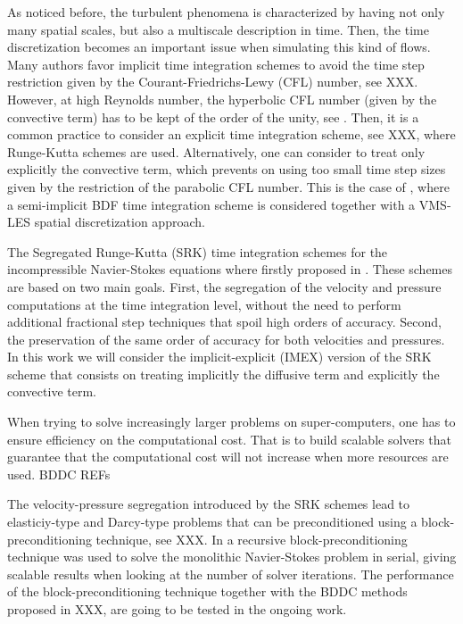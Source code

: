 As noticed before, the turbulent phenomena is characterized by having not only many spatial scales, but also a multiscale description in time. Then, the time discretization becomes an important issue when simulating this kind of flows. Many authors favor implicit time integration schemes to avoid the time step restriction given by the Courant-Friedrichs-Lewy (CFL) number, see XXX. However, at high Reynolds number, the hyperbolic CFL number (given by the convective term) has to be kept of the order of the unity, see \cite{choi_effects_of_the computational...}. Then, it is a common practice to consider an explicit time integration scheme, see XXX, where Runge-Kutta schemes are used. Alternatively, one can consider to treat only explicitly the convective term, which prevents on using too small time step sizes given by the restriction of the parabolic CFL number. This is the case of \cite{forti}, where a semi-implicit BDF time integration scheme is considered together with a VMS-LES spatial discretization approach.

The Segregated Runge-Kutta (SRK) time integration schemes for the incompressible Navier-Stokes equations where firstly proposed in \cite{colomes_segregated}. These schemes are based on two main goals. First, the segregation of the velocity and pressure computations at the time integration level, without the need to perform additional fractional step techniques that spoil high orders of accuracy. Second, the preservation of the same order of accuracy for both velocities and pressures. In this work we will consider the implicit-explicit (IMEX) version of the SRK scheme that consists on treating implicitly the diffusive term and explicitly the convective term.

When trying to solve increasingly larger problems on super-computers, one has to ensure efficiency on the computational cost. That is to build scalable solvers that guarantee that the computational cost will not increase when more resources are used. BDDC REFs

The velocity-pressure segregation introduced by the SRK schemes lead to elasticiy-type and Darcy-type problems that can be preconditioned using a block-preconditioning technique, see XXX. In \cite{colomes_mixed} a recursive block-preconditioning technique was used to solve the monolithic Navier-Stokes problem in serial, giving scalable results when looking at the number of solver iterations. The performance of the block-preconditioning technique together with the BDDC methods proposed in XXX, are going to be tested in the ongoing work.

